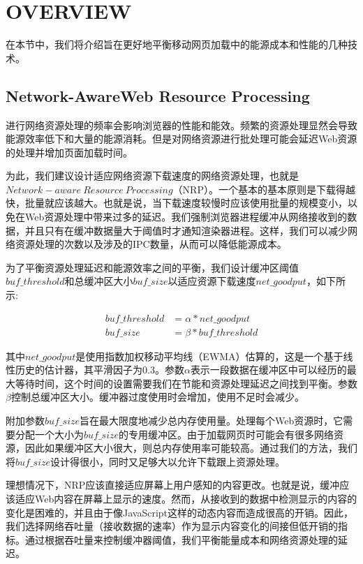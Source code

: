 \documentclass{sig-alternate-05-2015}
\begin{document}
\section{OVERVIEW}

在本节中，我们将介绍旨在更好地平衡移动网页加载中的能源成本和性能的几种技术。

\subsection{Network-AwareWeb Resource Processing}

进行网络资源处理的频率会影响浏览器的性能和能效。频繁的资源处理显然会导致能源效率低下和大量的能源消耗。但是对网络资源进行批处理可能会延迟Web资源的处理并增加页面加载时间。

为此，我们建议设计适应网络资源下载速度的网络资源处理，也就是$Network-aware\ Resource\ Processing$（NRP）\cite{1}。一个基本的基本原则是下载得越快，批量就应该越大。也就是说，当下载速度较慢时应该使用批量的规模变小，以免在Web资源处理中带来过多的延迟。我们强制浏览器进程缓冲从网络接收到的数据，并且只有在缓冲数据量大于阈值时才通知渲染器进程。这样，我们可以减少网络资源处理的次数以及涉及的IPC数量，从而可以降低能源成本。

为了平衡资源处理延迟和能源效率之间的平衡，我们设计缓冲区阈值$buf\_threshold$和总缓冲区大小$buf\_size$以适应资源下载速度$net\_goodput$，如下所示:

\begin{align*}
buf\_threshold &= \alpha * net\_goodput \\
buf\_size &= \beta * buf\_threshold
\end{align*}

其中$net\_goodput$是使用指数加权移动平均线（EWMA）估算的，这是一个基于线性历史的估计器，其平滑因子为$0.3$。\cite{9}\cite{10}参数$\alpha$表示一段数据在缓冲区中可以经历的最大等待时间，这个时间的设置需要我们在节能和资源处理延迟之间找到平衡。参数$\beta$控制总缓冲区大小。缓冲器过度使用时会增加，使用不足时会减少。

附加参数$buf\_size$旨在最大限度地减少总内存使用量。处理每个Web资源时，它需要分配一个大小为$buf\_size$的专用缓冲区。由于加载网页时可能会有很多网络资源，因此如果缓冲区大小很大，则总内存使用率可能较高。通过我们的方法，我们将$buf\_size$设计得很小，同时又足够大以允许下载跟上资源处理。

理想情况下，NRP应该直接适应屏幕上用户感知的内容更改。也就是说，缓冲应该适应Web内容在屏幕上显示的速度。然而，从接收到的数据中检测显示的内容的变化是困难的，并且由于像JavaScript这样的动态内容而造成很高的开销。因此，我们选择网络吞吐量（接收数据的速率）作为显示内容变化的间接但低开销的指标。通过根据吞吐量来控制缓冲器阈值，我们平衡能量成本和网络资源处理的延迟。
\end{document}
